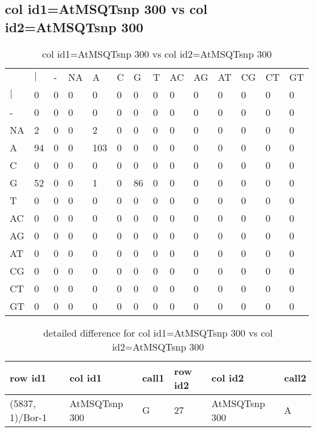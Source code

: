 \subsection{col id1=AtMSQTsnp 300 vs col id2=AtMSQTsnp 300}
\begin{center}
\begin{longtable}{|l|l|l|l|l|l|l|l|l|l|l|l|l|l|}
\caption{col id1=AtMSQTsnp 300 vs col id2=AtMSQTsnp 300} \label{table_dm834}\\
\hline
\\
\hline
&$|$&-&NA&A&C&G&T&AC&AG&AT&CG&CT&GT\\
$|$&0&0&0&0&0&0&0&0&0&0&0&0&0\\
-&0&0&0&0&0&0&0&0&0&0&0&0&0\\
NA&2&0&0&2&0&0&0&0&0&0&0&0&0\\
A&94&0&0&103&0&0&0&0&0&0&0&0&0\\
C&0&0&0&0&0&0&0&0&0&0&0&0&0\\
G&52&0&0&1&0&86&0&0&0&0&0&0&0\\
T&0&0&0&0&0&0&0&0&0&0&0&0&0\\
AC&0&0&0&0&0&0&0&0&0&0&0&0&0\\
AG&0&0&0&0&0&0&0&0&0&0&0&0&0\\
AT&0&0&0&0&0&0&0&0&0&0&0&0&0\\
CG&0&0&0&0&0&0&0&0&0&0&0&0&0\\
CT&0&0&0&0&0&0&0&0&0&0&0&0&0\\
GT&0&0&0&0&0&0&0&0&0&0&0&0&0\\
\hline
\end{longtable}
\end{center}

\begin{center}
\begin{longtable}{|l|l|l|l|l|l|}
\caption{detailed difference for col id1=AtMSQTsnp 300 vs col id2=AtMSQTsnp 300} \label{table_dm835}\\
\hline
row id1&col id1&call1&row id2&col id2&call2\\
\hline
(5837, 1)/Bor-1&AtMSQTsnp 300&G&27&AtMSQTsnp 300&A\\
\hline
\end{longtable}
\end{center}

